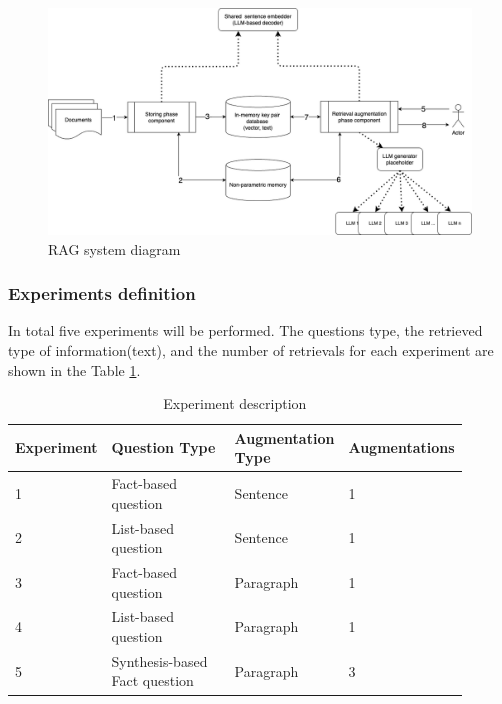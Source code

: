 \documentclass{wseas}
\begin{document}
\begin{figure}[htbp]
  \centering
  \includegraphics[width=\linewidth]{resources/v1/ragSystemArhitecture.png}
  \caption{RAG system diagram}
  \label{fig:rag_system_diagram_figure}
\end{figure}
\subsubsection{Experiments definition}


In total five experiments will be performed. The questions type, the retrieved type of information(text), 
and the number of retrievals for each experiment are shown in the Table \ref{tab:experiment_questions_table}. 

\begin{table}[htbp]
  \caption{Experiment description} 
  \label{tab:experiment_questions_table}
    \centering
      \begin{tabular} {|p{0.15\linewidth}|p{0.35\linewidth}|p{0.25\linewidth}|p{0.15\linewidth}|}
        \hline
        \textbf{Experiment} & \textbf{Question Type} & \textbf{Augmentation Type} & \textbf{Augmentations} \\ \hline
        1 & Fact-based question & Sentence & 1 \\ \hline
        2 & List-based question & Sentence & 1 \\ \hline
        3 & Fact-based question & Paragraph & 1 \\ \hline
        4 & List-based question & Paragraph & 1 \\ \hline
        5 & Synthesis-based Fact question & Paragraph & 3 \\ \hline
      \end{tabular}
\end{table}

    
\end{document}
